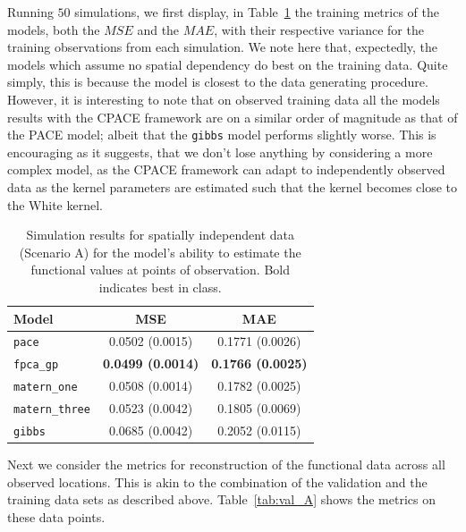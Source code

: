 Running $50$ simulations, we first display, in Table~\ref{tab:train_A} the training metrics of the models, both the $MSE$ and the $MAE$, with their respective variance for the training observations from each simulation. 
We note here that, expectedly, the models which assume no spatial dependency do best on the training data.
Quite simply, this is because the model is closest to the data generating procedure.
However, it is interesting to note that on observed training data all the models results with the CPACE framework are on a similar order of magnitude as that of the PACE model; albeit that the \verb*|gibbs| model performs slightly worse.
This is encouraging as it suggests, that we don't lose anything by considering a more complex model, as the CPACE framework can adapt to independently observed data as the kernel parameters are estimated such that the kernel becomes close to the White kernel.

\begin{table}
	\caption[Simulation results for Scenario A on training data]{Simulation results for spatially independent data (Scenario A) for the model's ability to estimate the functional values at points of observation. Bold indicates best in class.}
	\centering
	\label{tab:train_A}
	\begin{tabular}{lcc}
		\toprule
		\textbf{Model} & \textbf{MSE} & \textbf{MAE} \\
		\midrule
		\verb*|pace| & 0.0502 (0.0015) & 0.1771 (0.0026) \\
		\verb*|fpca_gp| & \textbf{0.0499 (0.0014)} & \textbf{0.1766 (0.0025)} \\
		\verb*|matern_one| & 0.0508 (0.0014) & 0.1782 (0.0025) \\
		\verb*|matern_three| & 0.0523 (0.0042) & 0.1805 (0.0069) \\
		\verb*|gibbs| & 0.0685 (0.0042) & 0.2052 (0.0115)\\
		\bottomrule
	\end{tabular}
\end{table}

Next we consider the metrics for reconstruction of the functional data across all observed locations.
This is akin to the combination of the validation and the training data sets as described above.
Table~\ref{tab:val_A} shows the metrics on these data points.

